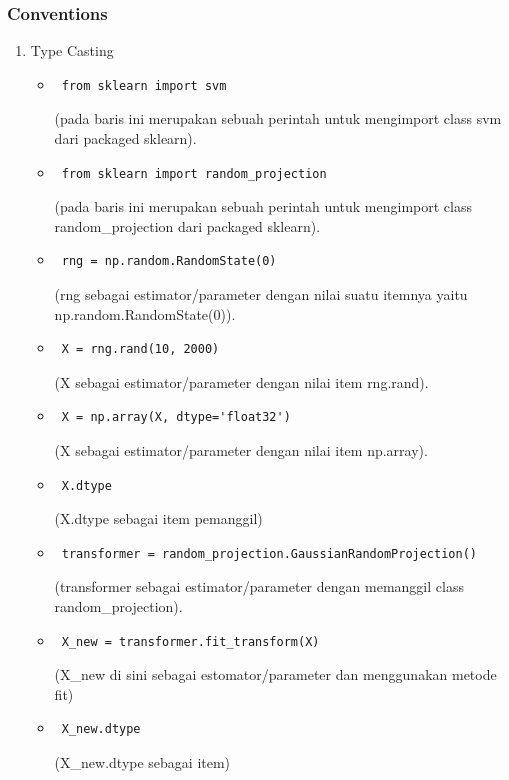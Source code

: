 \subsubsection{Conventions}
\begin{enumerate}
\item Type Casting
\begin{itemize}
\item\begin{verbatim} from sklearn import svm\end{verbatim}(pada baris ini merupakan sebuah perintah untuk mengimport class svm dari packaged sklearn).
\item\begin{verbatim} from sklearn import random_projection\end{verbatim}(pada baris ini merupakan sebuah perintah untuk mengimport class random\_projection dari packaged sklearn).
\item\begin{verbatim} rng = np.random.RandomState(0)\end{verbatim}(rng sebagai estimator/parameter dengan nilai suatu itemnya yaitu np.random.RandomState(0)).
\item\begin{verbatim} X = rng.rand(10, 2000)\end{verbatim}(X sebagai estimator/parameter dengan nilai item rng.rand).
\item\begin{verbatim} X = np.array(X, dtype='float32')\end{verbatim}(X sebagai estimator/parameter dengan nilai item np.array).
\item\begin{verbatim} X.dtype\end{verbatim}(X.dtype sebagai item pemanggil) 
\item\begin{verbatim} transformer = random_projection.GaussianRandomProjection()\end{verbatim}(transformer sebagai estimator/parameter dengan memanggil class random\_projection).
\item\begin{verbatim} X_new = transformer.fit_transform(X)\end{verbatim}(X\_new di sini sebagai estomator/parameter dan menggunakan metode fit)
\item\begin{verbatim} X_new.dtype\end{verbatim}(X\_new.dtype sebagai item) 

\end{itemize}
\end{enumerate}
